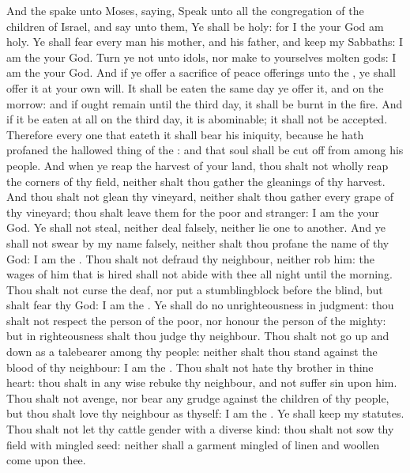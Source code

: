 \begin{biblechapter} %
 And the \LORD spake unto Moses, saying,
\verse Speak unto all the congregation of the children of Israel, and say unto them, Ye shall be holy: for I the \LORD your God am holy.
\verse Ye shall fear every man his mother, and his father, and keep my Sabbaths: I am the \LORD your God.
\verse Turn ye not unto idols, nor make to yourselves molten gods: I am the \LORD your God.
\verse And if ye offer a sacrifice of peace offerings unto the \LORD, ye shall offer it at your own will.
\verse It shall be eaten the same day ye offer it, and on the morrow: and if ought remain until the third day, it shall be burnt in the fire.
\verse And if it be eaten at all on the third day, it is abominable; it shall not be accepted.
\verse Therefore every one that eateth it shall bear his iniquity, because he hath profaned the hallowed thing of the \LORD: and that soul shall be cut off from among his people.
\verse And when ye reap the harvest of your land, thou shalt not wholly reap the corners of thy field, neither shalt thou gather the gleanings of thy harvest.
\verse And thou shalt not glean thy vineyard, neither shalt thou gather every grape of thy vineyard; thou shalt leave them for the poor and stranger: I am the \LORD your God.
\verse Ye shall not steal, neither deal falsely, neither lie one to another.
\verse And ye shall not swear by my name falsely, neither shalt thou profane the name of thy God: I am the \LORD.
\verse Thou shalt not defraud thy neighbour, neither rob him: the wages of him that is hired shall not abide with thee all night until the morning.
\verse Thou shalt not curse the deaf, nor put a stumblingblock before the blind, but shalt fear thy God: I am the \LORD.
\verse Ye shall do no unrighteousness in judgment: thou shalt not respect the person of the poor, nor honour the person of the mighty: but in righteousness shalt thou judge thy neighbour.
\verse Thou shalt not go up and down as a talebearer among thy people: neither shalt thou stand against the blood of thy neighbour: I am the \LORD.
\verse Thou shalt not hate thy brother in thine heart: thou shalt in any wise rebuke thy neighbour, and not suffer sin upon him.
\verse Thou shalt not avenge, nor bear any grudge against the children of thy people, but thou shalt love thy neighbour as thyself: I am the \LORD.
\verse Ye shall keep my statutes. Thou shalt not let thy cattle gender with a diverse kind: thou shalt not sow thy field with mingled seed: neither shall a garment mingled of linen and woollen come upon thee.

\end{biblechapter}
